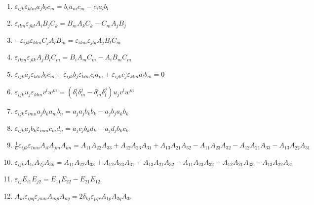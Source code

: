 \documentclass[11pt,a4paper]{article}
\begin{document}
\begin{enumerate}
\item $\displaystyle \varepsilon_{ijk}\varepsilon_{klm} a_{j} b_{l} c_{m} = b_{i} a_{m} c_{m} - c_{i} a_{l} b_{l}$
\item $\displaystyle \varepsilon_{ilm}\varepsilon_{jkl} A_{i} B_{j} C_{k} = B_{m} A_{k} C_{k} - C_{m} A_{j} B_{j}$
\item $\displaystyle -\varepsilon_{ijk}\varepsilon_{klm} C_{j} A_{l} B_{m} = \varepsilon_{ikm}\varepsilon_{jlk} A_{j} B_{l} C_{m}$
\item $\displaystyle \varepsilon_{ikm}\varepsilon_{jlk} A_{j} B_{l} C_{m} = B_{i} A_{m} C_{m} - A_{i} B_{m} C_{m}$
\item $\displaystyle \varepsilon_{ijk} a_{j}\varepsilon_{klm} b_{l} c_{m} + \varepsilon_{ijk} b_{j}\varepsilon_{klm} c_{l} a_{m} + \varepsilon_{ijk} c_{j}\varepsilon_{klm} a_{l} b_{m} = 0$
\item $\displaystyle \varepsilon_{ijk} u_{j}\varepsilon_{klm} v^{l} w^{m} = \left( \delta^{i}_{l}\delta^{j}_{m} - \delta^{i}_{m}\delta^{j}_{l} \right) u_{j} v^{l} w^{m}$
\item $\displaystyle \varepsilon_{ijk}\varepsilon_{imn} a_{j} b_{k} a_{m} b_{n} = a_{j} a_{j} b_{k} b_{k} - a_{j} b_{j} a_{k} b_{k}$
\item $\displaystyle \varepsilon_{ijk} a_{j} b_{k}\varepsilon_{imn} c_{m} d_{n} = a_{j} c_{j} b_{k} d_{k} - a_{j} d_{j} b_{k} c_{k}$
\item $\displaystyle \frac{1}{6}\varepsilon_{ijk}\varepsilon_{lmn} A_{il} A_{jm} A_{kn} = A_{11} A_{22} A_{33} + A_{12} A_{23} A_{31} + A_{13} A_{21} A_{32} - A_{11} A_{23} A_{32} - A_{12} A_{21} A_{33} - A_{13} A_{22} A_{31}$
\item $\displaystyle \varepsilon_{ijk} A_{1i} A_{2j} A_{3k} = A_{11} A_{22} A_{33} + A_{12} A_{23} A_{31} + A_{13} A_{21} A_{32} - A_{11} A_{23} A_{32} - A_{12} A_{21} A_{33} - A_{13} A_{22} A_{31}$
\item $\displaystyle \varepsilon_{ij} E_{i1} E_{j2} = E_{11} E_{22} - E_{21} E_{12}$
\item $\displaystyle A_{ki}\varepsilon_{ipq}\varepsilon_{jmn} A_{mp} A_{nq} = 2\delta_{kj}\varepsilon_{pqr} A_{1p} A_{2q} A_{3r}$
\end{enumerate}
\end{document}
